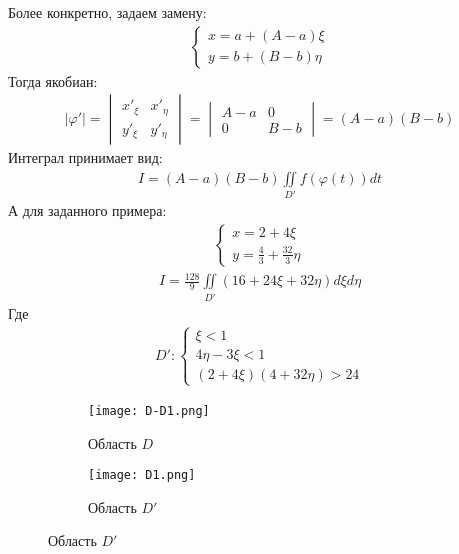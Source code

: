 Более конкретно, задаем замену:
\begin{align}
	\begin{cases}
		x = a + (A - a) \xi \\
		y = b + (B - b) \eta
	\end{cases}
\end{align}
Тогда якобиан:
\begin{align}
	|\varphi'| = \begin{vmatrix}
		             x'_\xi & x'_\eta \\
		             y'_\xi & y'_\eta
	             \end{vmatrix} = \begin{vmatrix}
		                             A - a & 0     \\
		                             0     & B - b
	                             \end{vmatrix} = (A - a) (B - b)
\end{align}
Интеграл принимает вид:
\begin{align}
	I = (A - a)(B - b)\iint\limits_{D'}f(\varphi(t))dt
\end{align}
А для заданного примера:
\begin{align}
	\begin{cases}
		x = 2 + 4 \xi \\
		y = \frac{4}{3} + \frac{32}{3} \eta
	\end{cases}
\end{align}
\begin{align}
	I = \frac{128}{9}\iint\limits_{D'}(16 + 24\xi + 32\eta)d\xi d\eta
\end{align}
Где
\begin{align}
	D'\colon \begin{cases}
		         \xi < 1      \\
		         4\eta-3\xi<1 \\
		         (2+4\xi)(4+32\eta)>24
	         \end{cases}
\end{align}

\begin{figure}[h]
	\begin{subfigure}{.5\textwidth}
		\centering
		\texttt{[image: D-D1.png]}
		\caption{Область \(D\)}
	\end{subfigure}
	\begin{subfigure}{.5\textwidth}
		\centering
		\texttt{[image: D1.png]}
		\caption{Область \(D'\)}
	\end{subfigure}
\end{figure}
